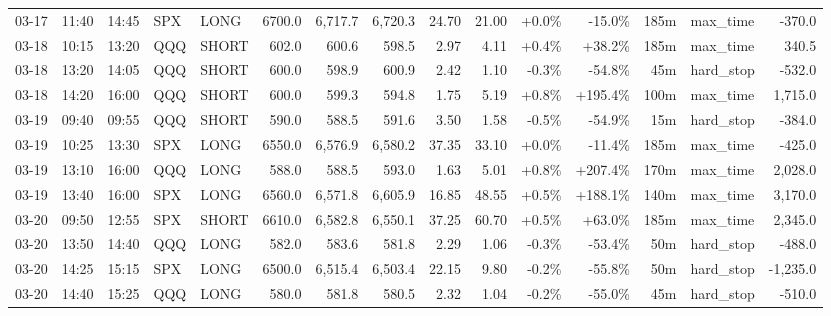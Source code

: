\documentclass[11pt,a4paper,twoside]{article}
\begin{document}
\begin{landscape}
\begin{center}
\begin{longtable}{>{\color{txtmain}}l l l l l r r r r r r r r >{\color{txtmain}}l r}
03-17 & 11:40 & 14:45 & SPX & LONG & 6700.0 & 6,717.7 & 6,720.3 & 24.70 & 21.00 & \textcolor{wingreen}{+0.0\%} & \textcolor{lossred}{-15.0\%} & 185m & max\_time & \textcolor{lossred}{-370.0} \\
03-18 & 10:15 & 13:20 & QQQ & SHORT & 602.0 & 600.6 & 598.5 & 2.97 & 4.11 & \textcolor{wingreen}{+0.4\%} & \textcolor{wingreen}{+38.2\%} & 185m & max\_time & \textcolor{wingreen}{340.5} \\
03-18 & 13:20 & 14:05 & QQQ & SHORT & 600.0 & 598.9 & 600.9 & 2.42 & 1.10 & \textcolor{lossred}{-0.3\%} & \textcolor{lossred}{-54.8\%} & 45m & hard\_stop & \textcolor{lossred}{-532.0} \\
03-18 & 14:20 & 16:00 & QQQ & SHORT & 600.0 & 599.3 & 594.8 & 1.75 & 5.19 & \textcolor{wingreen}{+0.8\%} & \textcolor{wingreen}{+195.4\%} & 100m & max\_time & \textcolor{wingreen}{1,715.0} \\
03-19 & 09:40 & 09:55 & QQQ & SHORT & 590.0 & 588.5 & 591.6 & 3.50 & 1.58 & \textcolor{lossred}{-0.5\%} & \textcolor{lossred}{-54.9\%} & 15m & hard\_stop & \textcolor{lossred}{-384.0} \\
03-19 & 10:25 & 13:30 & SPX & LONG & 6550.0 & 6,576.9 & 6,580.2 & 37.35 & 33.10 & \textcolor{wingreen}{+0.0\%} & \textcolor{lossred}{-11.4\%} & 185m & max\_time & \textcolor{lossred}{-425.0} \\
03-19 & 13:10 & 16:00 & QQQ & LONG & 588.0 & 588.5 & 593.0 & 1.63 & 5.01 & \textcolor{wingreen}{+0.8\%} & \textcolor{wingreen}{+207.4\%} & 170m & max\_time & \textcolor{wingreen}{2,028.0} \\
03-19 & 13:40 & 16:00 & SPX & LONG & 6560.0 & 6,571.8 & 6,605.9 & 16.85 & 48.55 & \textcolor{wingreen}{+0.5\%} & \textcolor{wingreen}{+188.1\%} & 140m & max\_time & \textcolor{wingreen}{3,170.0} \\
03-20 & 09:50 & 12:55 & SPX & SHORT & 6610.0 & 6,582.8 & 6,550.1 & 37.25 & 60.70 & \textcolor{wingreen}{+0.5\%} & \textcolor{wingreen}{+63.0\%} & 185m & max\_time & \textcolor{wingreen}{2,345.0} \\
03-20 & 13:50 & 14:40 & QQQ & LONG & 582.0 & 583.6 & 581.8 & 2.29 & 1.06 & \textcolor{lossred}{-0.3\%} & \textcolor{lossred}{-53.4\%} & 50m & hard\_stop & \textcolor{lossred}{-488.0} \\
03-20 & 14:25 & 15:15 & SPX & LONG & 6500.0 & 6,515.4 & 6,503.4 & 22.15 & 9.80 & \textcolor{lossred}{-0.2\%} & \textcolor{lossred}{-55.8\%} & 50m & hard\_stop & \textcolor{lossred}{-1,235.0} \\
03-20 & 14:40 & 15:25 & QQQ & LONG & 580.0 & 581.8 & 580.5 & 2.32 & 1.04 & \textcolor{lossred}{-0.2\%} & \textcolor{lossred}{-55.0\%} & 45m & hard\_stop & \textcolor{lossred}{-510.0} \\

\end{longtable}
\end{center}
\end{landscape}
\end{document}
